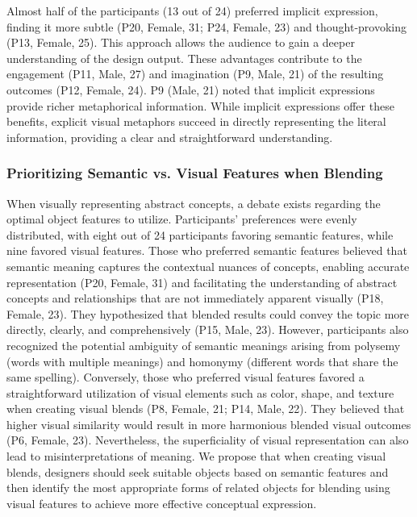 Almost half of the participants (13 out of 24) preferred implicit expression, finding it more subtle (P20, Female, 31; P24, Female, 23) and thought-provoking (P13, Female, 25). This approach allows the audience to gain a deeper understanding of the design output. These advantages contribute to the engagement (P11, Male, 27) and imagination (P9, Male, 21) of the resulting outcomes (P12, Female, 24). P9 (Male, 21) noted that implicit expressions provide richer metaphorical information.
While implicit expressions offer these benefits, explicit visual metaphors succeed in directly representing the literal information, providing a clear and straightforward understanding.




\subsubsection{Prioritizing Semantic vs. Visual Features when Blending}

When visually representing abstract concepts, a debate exists regarding the optimal object features to utilize.
Participants' preferences were evenly distributed, with eight out of 24 participants favoring semantic features, while nine favored visual features.
Those who preferred semantic features believed that semantic meaning captures the contextual nuances of concepts, enabling accurate representation (P20, Female, 31) and facilitating the understanding of abstract concepts and relationships that are not immediately apparent visually (P18, Female, 23). 
They hypothesized that blended results could convey the topic more directly, clearly, and comprehensively (P15, Male, 23).
However, participants also recognized the potential ambiguity of semantic meanings arising from polysemy (words with multiple meanings) and homonymy (different words that share the same spelling).
Conversely, those who preferred visual features favored a straightforward utilization of visual elements such as color, shape, and texture when creating visual blends (P8, Female, 21; P14, Male, 22). 
They believed that higher visual similarity would result in more harmonious blended visual outcomes (P6, Female, 23). 
Nevertheless, the superficiality of visual representation can also lead to misinterpretations of meaning.
We propose that when creating visual blends, designers should seek suitable objects based on semantic features and then identify the most appropriate forms of related objects for blending using visual features to achieve more effective conceptual expression.


